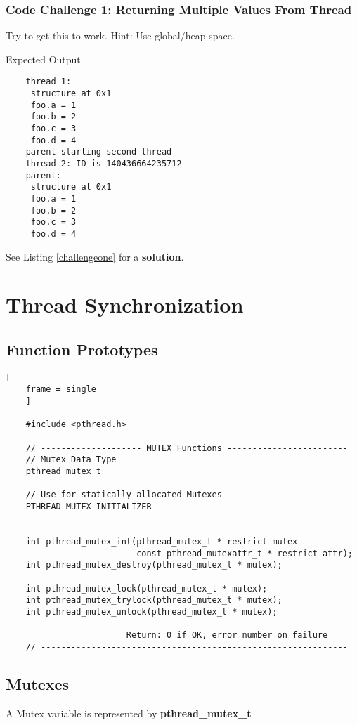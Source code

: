 \documentclass{article}
\begin{document}
\subsubsection{Code Challenge 1: Returning Multiple Values From Thread}
Try to get this to work. Hint: Use global/heap space.

{\Large Expected Output}
\begin{verbatim}
    thread 1:
     structure at 0x1
     foo.a = 1
     foo.b = 2
     foo.c = 3
     foo.d = 4
    parent starting second thread
    thread 2: ID is 140436664235712
    parent:
     structure at 0x1
     foo.a = 1
     foo.b = 2
     foo.c = 3
     foo.d = 4
\end{verbatim}
See Listing \ref{challengeone} for a \textbf{solution}.

\clearpage
\section{Thread Synchronization}
\subsection{Function Prototypes}
\begin{lstlisting}[
    frame = single
    ]

    #include <pthread.h>

    // -------------------- MUTEX Functions ------------------------
    // Mutex Data Type
    pthread_mutex_t

    // Use for statically-allocated Mutexes
    PTHREAD_MUTEX_INITIALIZER


    int pthread_mutex_int(pthread_mutex_t * restrict mutex
                          const pthread_mutexattr_t * restrict attr);
    int pthread_mutex_destroy(pthread_mutex_t * mutex);

    int pthread_mutex_lock(pthread_mutex_t * mutex);
    int pthread_mutex_trylock(pthread_mutex_t * mutex);
    int pthread_mutex_unlock(pthread_mutex_t * mutex);

                        Return: 0 if OK, error number on failure
    // -------------------------------------------------------------

\end{lstlisting}

\subsection{Mutexes}
A Mutex variable is represented by \textbf{pthread\_mutex\_t}
\end{document}
